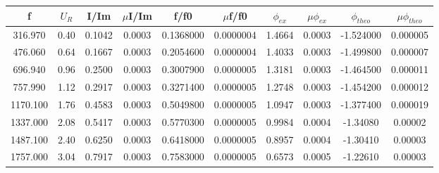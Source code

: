 \documentclass[12pt,a4paper]{article}
\begin{document}
\begin{table}[H]
    \begin{tabular}{|c|c|c|c|c|c|c|c|c|c|}
    \hline
    \textbf{f} & \textbf{$U_R$} & \textbf{I/Im} & \textbf{$\mu$I/Im} & \textbf{f/f0} & \textbf{$\mu$f/f0} & \textbf{$\phi_{ex}$} & \textbf{$\mu\phi_{ex}$} & \textbf{$\phi_{theo}$} & \textbf{$\mu\phi_{theo}$} \\ \hline
    316.970        & 0.40           & 0.1042            & 0.0003                 & 0.1368000         & 0.0000004              & 1.4664                   & 0.0003                      & -1.524000                  & 0.000005                      \\ \hline
    476.060        & 0.64           & 0.1667            & 0.0003                 & 0.2054600         & 0.0000004              & 1.4033                   & 0.0003                      & -1.499800                  & 0.000007                      \\ \hline
    696.940        & 0.96           & 0.2500            & 0.0003                 & 0.3007900         & 0.0000005              & 1.3181                   & 0.0003                      & -1.464500                  & 0.000011                      \\ \hline
    757.990        & 1.12           & 0.2917            & 0.0003                 & 0.3271400         & 0.0000005              & 1.2748                   & 0.0003                      & -1.454200                  & 0.000012                      \\ \hline
    1170.100       & 1.76           & 0.4583            & 0.0003                 & 0.5049800         & 0.0000005              & 1.0947                   & 0.0003                      & -1.377400                  & 0.000019                      \\ \hline
    1337.000       & 2.08           & 0.5417            & 0.0003                 & 0.5770300         & 0.0000005              & 0.9984                   & 0.0004                      & -1.34080                   & 0.00002                       \\ \hline
    1487.100       & 2.40           & 0.6250            & 0.0003                 & 0.6418000         & 0.0000005              & 0.8957                   & 0.0004                      & -1.30410                   & 0.00003                       \\ \hline
    1757.000       & 3.04           & 0.7917            & 0.0003                 & 0.7583000         & 0.0000005              & 0.6573                   & 0.0005                      & -1.22610                   & 0.00003                       \\ \hline

\end{tabular}
\end{table}
\end{document}
